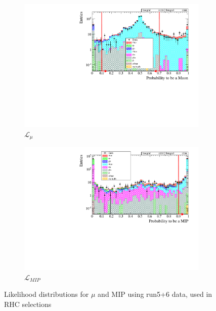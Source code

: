 \begin{figure}[!h]
	\begin{subfigure}[t]{0.49\textwidth}
		\includegraphics[width=\textwidth]{figures/numu/Cuts/numubar/likemu_numubar}
		\caption{$\mathcal{L}_\mu$}
	\end{subfigure}
	\begin{subfigure}[t]{0.49\textwidth}
		\includegraphics[width=\textwidth]{figures/numu/Cuts/numubar/likemip_numubar}
		\caption{$\mathcal{L}_{MIP}$}
	\end{subfigure}
	\caption{Likelihood distributions for $\mu$ and MIP using run5+6 \numubar data, used in \numubar RHC selections}
	\label{fig:numubar_likelihood}
\end{figure}

